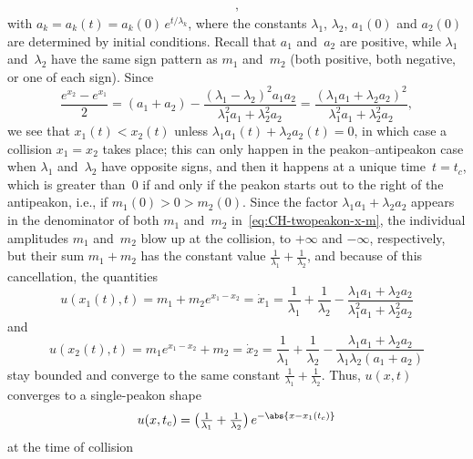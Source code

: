 \documentclass[10pt,a4paper]{article} \pdfoutput=1 
\begin{document}
\begin{example}
\begin{equation}
\begin{aligned}
      ,
    \end{aligned}
  \end{equation}
  with $a_k = a_k(t) = a_k(0) \, e^{t/\lambda_k}$,
  where the constants
  $\lambda_1$, $\lambda_2$, $a_1(0)$ and $a_2(0)$
  are determined by initial conditions.
  Recall that $a_1$ and~$a_2$ are positive,
  while $\lambda_1$ and~$\lambda_2$ have the same sign pattern as $m_1$ and~$m_2$
  (both positive, both negative, or one of each sign).
  Since
  \begin{equation*}
    \frac{e^{x_2} - e^{x_1}}{2}
    = (a_1 + a_2) - \frac{(\lambda_1-\lambda_2)^2 a_1 a_2}{\lambda_1^2 a_1 + \lambda_2 ^2a_2}
    = \frac{(\lambda_1 a_1 + \lambda_2 a_2)^2}{\lambda_1^2 a_1 + \lambda_2 ^2a_2}
    ,
  \end{equation*}
  we see that $x_1(t) < x_2(t)$ unless $\lambda_1 a_1(t) + \lambda_2 a_2(t) = 0$,
  in which case a collision $x_1=x_2$ takes place;
  this can only happen in the peakon--antipeakon case when $\lambda_1$ and~$\lambda_2$
  have opposite signs,
  and then it happens at a unique time~$t=t_c$, which is greater than~$0$
  if and only if the peakon starts out to the right of the antipeakon,
  i.e., if $m_1(0) > 0 > m_2(0)$.
  Since the factor $\lambda_1 a_1 + \lambda_2 a_2$ appears in the denominator
  of both $m_1$ and~$m_2$ in~\eqref{eq:CH-twopeakon-x-m},
  the individual amplitudes $m_1$ and~$m_2$ blow up at the collision,
  to $+\infty$ and $-\infty$, respectively, but
  their sum $m_1 + m_2$ has the constant value $\tfrac{1}{\lambda_1} + \tfrac{1}{\lambda_2}$,
  and because of this cancellation, the quantities
  \begin{equation*}
    u(x_1(t),t)
    = m_1 + m_2 e^{x_1-x_2}
    = \dot x_1
    = \frac{1}{\lambda_1} + \frac{1}{\lambda_2} - \frac{\lambda_1 a_1 + \lambda_2 a_2}{\lambda_1^2 a_1 + \lambda_2^2 a_2}
  \end{equation*}
  and
  \begin{equation*}
    u(x_2(t),t)
    = m_1 e^{x_1-x_2} + m_2
    = \dot x_
    2 = \frac{1}{\lambda_1} + \frac{1}{\lambda_2} - \frac{\lambda_1 a_1 + \lambda_2 a_2}{\lambda_1 \lambda_2 (a_1 + a_2)}
  \end{equation*}
  stay bounded and converge to the same constant $\tfrac{1}{\lambda_1} + \tfrac{1}{\lambda_2}$.
  Thus, $u(x,t)$ converges to a single-peakon shape
  \begin{equation*}
    u(x,t_c) = \bigl( \tfrac{1}{\lambda_1} + \tfrac{1}{\lambda_2} \bigr) \, e^{-\abs{x-x_1(t_c)}}
  \end{equation*}
  at the time of collision

\end{example}
\end{document}
